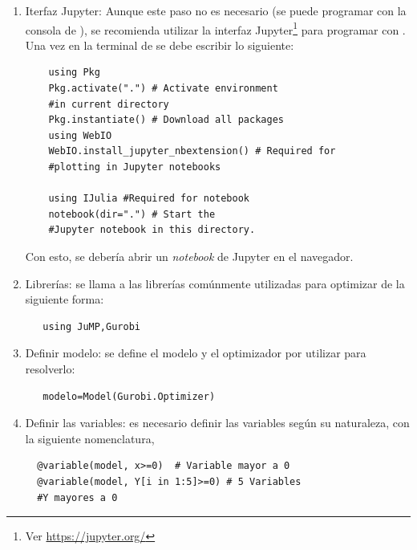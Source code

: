 \begin{enumerate}
    \item Iterfaz Jupyter: Aunque este paso no es necesario (se puede programar con la consola de \julia), se recomienda utilizar la interfaz Jupyter\footnote{Ver \url{https://jupyter.org/}} para programar con \julia. Una vez en la terminal de \julia se debe escribir lo siguiente:
    
    \begin{footnotesize}
    \begin{lstlisting}
    using Pkg
    Pkg.activate(".") # Activate environment 
    #in current directory
    Pkg.instantiate() # Download all packages
    using WebIO
    WebIO.install_jupyter_nbextension() # Required for 
    #plotting in Jupyter notebooks

    using IJulia #Required for notebook
    notebook(dir=".") # Start the 
    #Jupyter notebook in this directory.
    \end{lstlisting}
    \end{footnotesize}
    
    Con esto, se debería abrir un \textit{notebook} de Jupyter en el navegador.
    
   \item Librerías: se llama a las librerías comúnmente utilizadas para optimizar de la siguiente forma:
   
   \begin{footnotesize}
   \begin{lstlisting}
   using JuMP,Gurobi
   \end{lstlisting}
   \end{footnotesize}
   
   \item Definir modelo: se define el modelo y el optimizador por utilizar para resolverlo:
   
   \begin{footnotesize}
   \begin{lstlisting}
   modelo=Model(Gurobi.Optimizer)
   \end{lstlisting}
   \end{footnotesize}
   
   \item Definir las variables: es necesario definir las variables según su naturaleza, con la siguiente nomenclatura,
   
   \begin{footnotesize}
   \begin{lstlisting}
  @variable(model, x>=0)  # Variable mayor a 0
  @variable(model, Y[i in 1:5]>=0) # 5 Variables 
  #Y mayores a 0
   \end{lstlisting}
   \end{footnotesize}
   

\end{enumerate}
